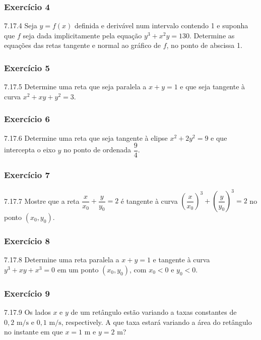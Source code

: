 \subsubsection*{Exercício 4}
\begin{exercicio}[4]{7.17.4}
Seja $y = f(x)$ definida e derivável num intervalo contendo 1 e suponha que $f$ seja dada implicitamente pela equação $y^3 + x^2 y = 130$. Determine as equações das retas tangente e normal ao gráfico de $f$, no ponto de abscissa 1.
\end{exercicio}

\subsubsection*{Exercício 5}
\begin{exercicio}[5]{7.17.5}
Determine uma reta que seja paralela a $x + y = 1$ e que seja tangente à curva $x^2 + xy + y^2 = 3$.
\end{exercicio}

\subsubsection*{Exercício 6}
\begin{exercicio}[6]{7.17.6}
Determine uma reta que seja tangente à elipse $x^2 + 2y^2 = 9$ e que intercepta o eixo $y$ no ponto de ordenada $\dfrac{9}{4}$.
\end{exercicio}

\subsubsection*{Exercício 7}
\begin{exercicio}[7]{7.17.7}
Mostre que a reta $\dfrac{x}{x_0} + \dfrac{y}{y_0} = 2$ é tangente à curva $\left(\dfrac{x}{x_0}\right)^{\!3} + \left(\dfrac{y}{y_0}\right)^{\!3} = 2$ no ponto $(x_0, y_0)$.
\end{exercicio}

\subsubsection*{Exercício 8}
\begin{exercicio}[8]{7.17.8}
Determine uma reta paralela a $x + y = 1$ e tangente à curva $y^3 + xy + x^3 = 0$ em um ponto $(x_0, y_0)$, com $x_0 < 0$ e $y_0 < 0$.
\end{exercicio}

\subsubsection*{Exercício 9}
\begin{exercicio}[9]{7.17.9}
Os lados $x$ e $y$ de um retângulo estão variando a taxas constantes de $0{,}2\text{ m/s}$ e $0{,}1\text{ m/s}$, respectively. A que taxa estará variando a área do retângulo no instante em que $x = 1\text{ m}$ e $y = 2\text{ m}$?
\end{exercicio}

